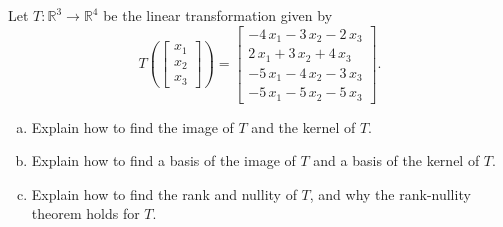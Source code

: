 
\begin{exerciseStatement}
 Let \(T:\mathbb{R}^ 3  \to \mathbb{R}^ 4 \) be the linear transformation given by \[T\left(  \left[\begin{array}{c}
x_{1} \\
x_{2} \\
x_{3}
\end{array}\right]  \right) =  \left[\begin{array}{c}
-4 \, x_{1} - 3 \, x_{2} - 2 \, x_{3} \\
2 \, x_{1} + 3 \, x_{2} + 4 \, x_{3} \\
-5 \, x_{1} - 4 \, x_{2} - 3 \, x_{3} \\
-5 \, x_{1} - 5 \, x_{2} - 5 \, x_{3}
\end{array}\right] .\]
\begin{enumerate}[(a)]
\item Explain how to find the image of \(T\) and the kernel of \(T\).
\item Explain how to find a basis of the image of \(T\) and a basis of the kernel of \(T\).
\item Explain how to find the rank and nullity of \(T\), and why the rank-nullity theorem holds for \(T\).
\end{enumerate}
    
\end{exerciseStatement}
    
